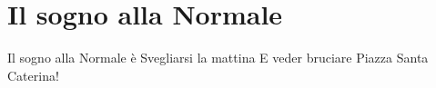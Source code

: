 \section{Il sogno alla Normale}
\subtitle{Sulla melodia di “Il sogno di un Pisano”}
\begin{canzone}
Il sogno alla Normale è 
Svegliarsi la mattina
E veder bruciare 
Piazza Santa Caterina! 
\end{canzone}
